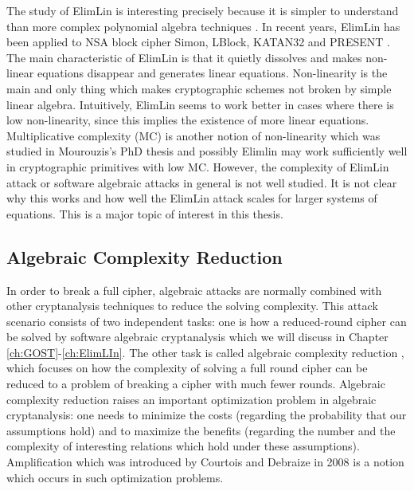 The study of ElimLin is interesting \cite{ElimLinRevisit,ElimLinUniversalEqs}
precisely because it is simpler to understand than more complex
polynomial algebra techniques \cite{XL,XL2,XLAsEstCourt04,Bardet,DoSemiRegularSequencesExist}. In recent years, ElimLin has been applied to NSA block cipher Simon, LBlock, KATAN32 and PRESENT \cite{courtois2014combined,RaddumSimon,ElimLinUniversalEqs,nakahara2009linear}. The main characteristic of ElimLin is that it quietly dissolves
and makes non-linear equations disappear and generates linear equations. Non-linearity is the main and only thing which makes cryptographic schemes not broken by simple linear algebra. Intuitively, ElimLin seems to work better in cases where there is low non-linearity, since this implies the existence of more linear equations.  Multiplicative complexity (MC) is another notion of non-linearity which was studied in Mourouzis's PhD thesis \cite{TheoPhD} and possibly Elimlin may work sufficiently well in cryptographic primitives with low MC.
However, the complexity of ElimLin attack or software algebraic attacks in general is not well studied. It is not clear why this works and how well the ElimLin attack scales for larger systems of equations. This is a major topic of interest in this thesis.

%

\subsection{Algebraic Complexity Reduction} \label{sec:ACReduction}

In order to break a full cipher, algebraic attacks are normally combined with other cryptanalysis techniques to reduce the solving complexity. This attack scenario consists of two independent tasks: one is how a reduced-round cipher can be solved by software algebraic cryptanalysis which we will discuss in Chapter \ref{ch:GOST}-\ref{ch:ElimLIn}. The other task is called algebraic complexity reduction \cite{gostreport,gostac}, which focuses on how the complexity of solving a full round cipher can be reduced to a problem of breaking a cipher with much fewer rounds. Algebraic complexity reduction raises an important optimization problem in algebraic cryptanalysis: one needs to minimize the costs (regarding the probability that our assumptions hold) and to maximize the benefits (regarding the number and the complexity of interesting relations
which hold under these assumptions).  Amplification which was introduced by Courtois and Debraize in 2008 \cite{AlgSnowCourtoisDebraize} is a notion which occurs in such optimization problems.

